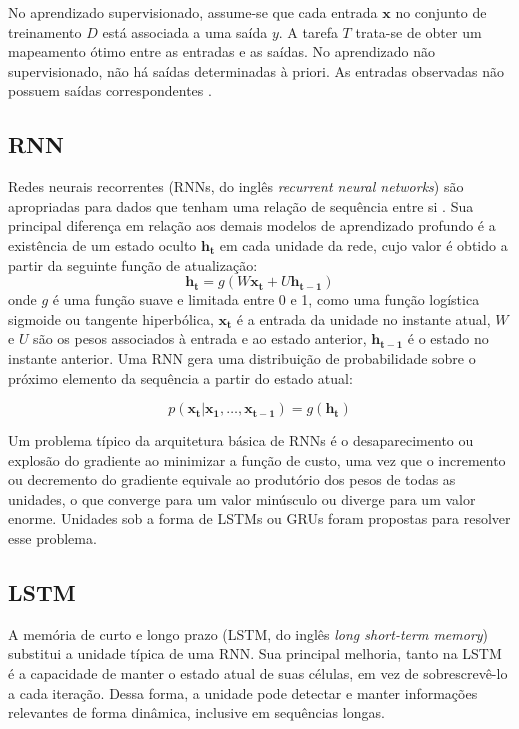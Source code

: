 No aprendizado supervisionado, assume-se que cada entrada $\mathbf{x}$ no
conjunto de treinamento $D$ está associada a uma saída $y$. A tarefa $T$
trata-se de obter um mapeamento ótimo entre as entradas e as saídas. No
aprendizado não supervisionado, não há saídas determinadas à priori. As entradas
observadas não possuem saídas correspondentes \cite{pml1Book}.

\subsection{RNN}
Redes neurais recorrentes (RNNs, do inglês \textit{recurrent neural networks})
 são apropriadas para dados que tenham uma relação de sequência entre si
 \cite{gru4rec_1}. Sua principal diferença em relação aos demais modelos de
 aprendizado profundo é a existência de um estado oculto $\mathbf{h_t}$ em
 cada unidade da rede, cujo valor é obtido a partir da seguinte função de
 atualização:
\begin{equation}
    \mathbf{h_t} = g(W\mathbf{x_t} + U\mathbf{h_{t-1}})
\end{equation}
onde $g$ é uma função suave e limitada entre 0 e 1, como uma função logística
sigmoide ou tangente hiperbólica, $\mathbf{x_t}$ é a entrada da unidade no
instante atual, $W$ e $U$ são os pesos associados à entrada e ao estado
anterior, $\mathbf{h_{t-1}}$ é o estado no instante anterior. Uma RNN gera uma
distribuição de probabilidade sobre o próximo elemento da sequência a partir do
estado atual:

\begin{equation}
    p(\mathbf{x_t}|\mathbf{x_1},\ldots , \mathbf{x_{t-1}}) = g(\mathbf{h_t})
\end{equation}

Um problema típico da arquitetura básica de RNNs é o desaparecimento ou explosão
do gradiente ao minimizar a função de custo, uma vez que o incremento ou
decremento do gradiente equivale ao produtório dos pesos de todas as unidades, o
que converge para um valor minúsculo ou diverge para um valor enorme. Unidades
sob a forma de LSTMs ou GRUs foram propostas para resolver esse problema.


\subsection{LSTM}
A memória de curto e longo prazo (LSTM, do inglês \textit{long short-term
memory}) \cite{chung2014empirical} substitui a unidade típica de uma RNN. Sua
principal melhoria, tanto na LSTM é a capacidade de manter o estado atual
de suas células, em vez de sobrescrevê-lo a cada iteração. Dessa forma, a
unidade pode detectar e manter informações relevantes de forma dinâmica,
inclusive em sequências longas.

